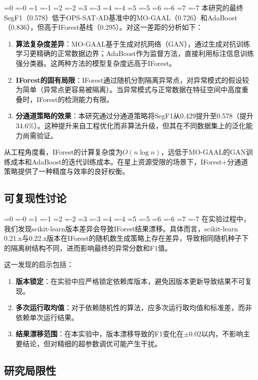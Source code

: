 \documentclass[12pt, a4paper]{article}
\newcommand{\zihao}[1]{%
    \ifnum#1=0 {\fontsize{42pt}{50pt}\selectfont}%
    \else\ifnum#1=-0 {\fontsize{36pt}{44pt}\selectfont}%
    \else\ifnum#1=1 {\fontsize{26pt}{32pt}\selectfont}%
    \else\ifnum#1=-1 {\fontsize{24pt}{28pt}\selectfont}%
    \else\ifnum#1=2 {\fontsize{22pt}{26pt}\selectfont}%
    \else\ifnum#1=-2 {\fontsize{18pt}{22pt}\selectfont}%
    \else\ifnum#1=3 {\fontsize{16pt}{20pt}\selectfont}%
    \else\ifnum#1=-3 {\fontsize{15pt}{18pt}\selectfont}%
    \else\ifnum#1=4 {\fontsize{14pt}{17pt}\selectfont}%
    \else\ifnum#1=-4 {\fontsize{12pt}{15pt}\selectfont}%
    \else\ifnum#1=5 {\fontsize{10.5pt}{13pt}\selectfont}%
    \else\ifnum#1=-5 {\fontsize{9pt}{11pt}\selectfont}%
    \else\ifnum#1=6 {\fontsize{7.5pt}{9pt}\selectfont}%
    \else\ifnum#1=-6 {\fontsize{6.5pt}{8pt}\selectfont}%
    \else\ifnum#1=7 {\fontsize{5.5pt}{7pt}\selectfont}%
    \else\ifnum#1=-7 {\fontsize{5pt}{6pt}\selectfont}%
    \fi\fi\fi\fi\fi\fi\fi\fi\fi\fi\fi\fi\fi\fi\fi\fi
}
\newcommand{\songti}{\CJKfontspec{SimSun}}
\begin{document}
\zihao{5}\songti
本研究的最终SegF1（0.578）低于OPS-SAT-AD基准中的MO-GAAL（0.726）和AdaBoost（0.836），但高于IForest基线（0.295）。对这一差距的分析如下：

\begin{enumerate}[label=(\arabic*)]
    \item \textbf{算法复杂度差异}：MO-GAAL基于生成对抗网络（GAN），通过生成对抗训练学习更精确的正常数据边界；AdaBoost作为监督方法，直接利用标注信息训练强分类器。这两种方法的模型复杂度远高于IForest。
    \item \textbf{IForest的固有局限}：IForest通过随机分割隔离异常点，对异常模式的假设较为简单（异常点更容易被隔离）。当异常模式与正常数据在特征空间中高度重叠时，IForest的检测能力有限。
    \item \textbf{分通道策略的效果}：本研究通过分通道策略将SegF1从0.429提升至0.578（提升34.6\%）。这种提升来自工程优化而非算法升级，但其在不同数据集上的泛化能力尚需验证。
\end{enumerate}

从工程角度看，IForest的计算复杂度为$O(n\log n)$，远低于MO-GAAL的GAN训练成本和AdaBoost的迭代训练成本。在星上资源受限的场景下，IForest+分通道策略提供了一种精度与效率的良好权衡。

\subsection{可复现性讨论}

\zihao{5}\songti
在实验过程中，我们发现scikit-learn版本差异会导致IForest结果漂移。具体而言，scikit-learn 0.21.x与0.22.x版本在IForest的随机数生成策略上存在差异，导致相同随机种子下的隔离树结构不同，进而影响最终的异常分数和F1值。

这一发现的启示包括：
\begin{enumerate}[label=(\arabic*)]
    \item \textbf{版本锁定}：在实验中应严格锁定依赖库版本，避免因版本更新导致结果不可复现。
    \item \textbf{多次运行取均值}：对于依赖随机性的算法，应多次运行取均值和标准差，而非依赖单次运行结果。
    \item \textbf{结果漂移范围}：在本实验中，版本漂移导致的F1变化在$\pm 0.02$以内，不影响主要结论，但对精细的超参数调优可能产生干扰。
\end{enumerate}

\subsection{研究局限性}
\end{document}
